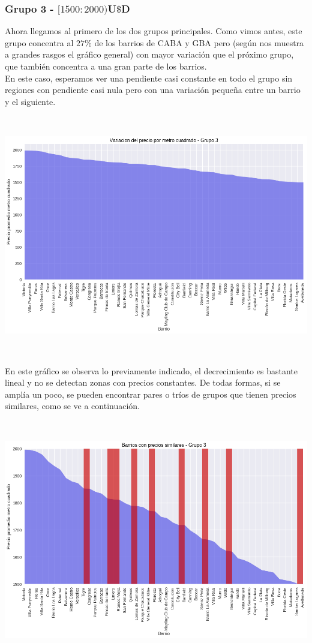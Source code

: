 \documentclass[a4paper, 10pt]{article}
\newcommand\tab[1][0.5cm]{\hspace*{#1}}
\begin{document}
				\subsubsection{Grupo 3 - $[1500:2000)$U$\$$D}
					Ahora llegamos al primero de los dos grupos principales. Como vimos antes, este grupo concentra al $27\%$ de
					los barrios de CABA y GBA pero (según nos muestra a grandes rasgos el gráfico general) con mayor variación
					que el próximo grupo, que también concentra a una gran parte de los barrios.\\
					\tab En este caso, esperamos ver una pendiente casi constante en todo el grupo sin regiones con pendiente
					casi nula pero con una variación pequeña entre un barrio y el siguiente.
					\begin{center}
   		    				\includegraphics[width=6in, height=4.13in]{images/m2Group3Area}
				  	\end{center}
				  	\tab En este gráfico se observa lo previamente indicado, el decrecimiento es bastante lineal y no se detectan
				  	zonas con precios constantes. De todas formas, si se amplía un poco, se pueden encontrar pares o tríos de grupos
				  	que tienen precios similares, como se ve a continuación.
				  	\begin{center}
   		    				\includegraphics[width=6in, height=4.13in]{images/m2Group3Detail}
				  	\end{center}
\end{document}
